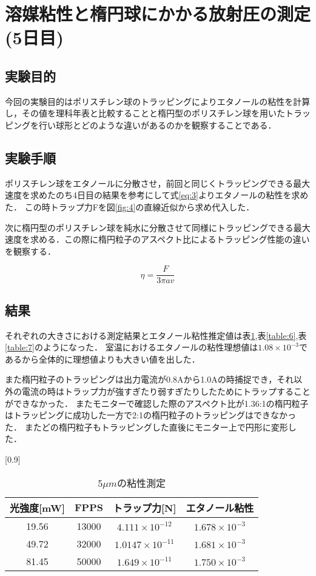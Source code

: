 \documentclass[11pt, a4paper,twocolumn]{jarticle}
\begin{document}
\section{溶媒粘性と楕円球にかかる放射圧の測定 (5日目)}
\subsection{実験目的}
今回の実験目的はポリスチレン球のトラッピングによりエタノールの粘性を計算し，その値を理科年表と比較することと楕円型のポリスチレン球を用いたトラッピングを行い球形とどのような違いがあるのかを観察することである．
\subsection{実験手順}
ポリスチレン球をエタノールに分散させ，前回と同じくトラッピングできる最大速度を求めたのち4日目の結果を参考にして式\ref{eq:3}よりエタノールの粘性を求めた．
この時トラップ力Fを図\ref{fig:4}の直線近似から求め代入した．

次に楕円型のポリスチレン球を純水に分散させて同様にトラッピングできる最大速度を求める．この際に楕円粒子のアスペクト比によるトラッピング性能の違いを観察する．

\begin{equation}
    \eta = \frac{F}{3\pi av}
\label{eq:3}
\end{equation}

\subsection{結果}
それぞれの大きさにおける測定結果とエタノール粘性推定値は表\ref{table:5},表\ref{table:6},表\ref{table:7}のようになった．
室温におけるエタノールの粘性理想値は$1.08 \times{10^{-3}}$であるから全体的に理想値よりも大きい値を出した．

また楕円粒子のトラッピングは出力電流が0.8Aから1.0Aの時捕捉でき，それ以外の電流の時はトラップ力が強すぎたり弱すぎたりしたためにトラップすることができなかった．
またモニターで確認した際のアスペクト比が1.36:1の楕円粒子はトラッピングに成功した一方で2:1の楕円粒子のトラッピングはできなかった．
またどの楕円粒子もトラッピングした直後にモニター上で円形に変形した．

\begin{table}[htbp]
    \begin{center}
        \scalebox{0.8}[0.9]{ %
        \begin{tabular}{cccc}
            光強度[mW] & FPPS & トラップ力[N] & エタノール粘性 \\ \hline
            19.56  & 13000 & $4.111\times 10^{-12}$  & $1.678\times 10^{-3}$  \\
            49.72 & 32000 & $1.0147\times 10^{-11}$  & $1.681\times 10^{-3}$ \\
            81.45 & 50000 & $1.649\times 10^{-11}$  & $1.750\times 10^{-3}$
        \end{tabular}
        }
        \caption{5$\mu m$の粘性測定}
        \label{table:5}
    \end{center}
\end{table}
\end{document}
